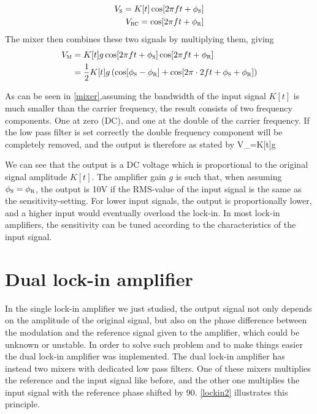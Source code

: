 \begin{align}
V_{\mbox{\footnotesize{\scshape{s}}}}=K[t]\cos[2\pi ft+\phi_{\mbox{\footnotesize{\scshape{s}}}}]
\label{sinusoidal}\\
V_{\mbox{\footnotesize{\scshape{rc}}}}=\cos[2\pi ft+\phi_{\mbox{\footnotesize{\scshape{r}}}}]
\label{reference}
\end{align}
The mixer then combines these two signals by multiplying them, giving
\begin{align}
V_{\mbox{\footnotesize{\scshape{m}}}}&=K[t] g\cos[2\pi ft+\phi_{\mbox{\footnotesize{\scshape{s}}}}]\cos[2\pi ft+\phi_{\mbox{\footnotesize{\scshape{r}}}}]\nonumber\\
&=\frac{1}{2}K[t]g\left(\cos[\phi_{\mbox{\footnotesize{\scshape{s}}}}-\phi_{\mbox{\footnotesize{\scshape{r}}}}]+\cos[2\pi\cdot2ft+\phi_{\mbox{\footnotesize{\scshape{s}}}}+ \phi_{\mbox{\footnotesize{\scshape{r}}}}]\right)\label{mixer}
\end{align}

As can be seen in \cref{mixer},assuming the bandwidth of the input signal $K[t]$ is much smaller than the carrier frequency, the result consists of two frequency components. One at zero (DC), and one at the double of the carrier frequency. If the low pass filter is set correctly the double frequency component will be completely removed, and the output is therefore as stated by
\mate
V_{}=K[t]g\cos{}
\atem

We can see that the output is a DC voltage which is proportional to the original signal amplitude $K[t]$. The amplifier gain $g$ is such that, when assuming  $\phi_{\mbox{\footnotesize{\scshape{s}}}}=\phi_{\mbox{\footnotesize{\scshape{r}}}}$, the output is 10V if the RMS-value of the input signal is the same as the sensitivity-setting. For lower input signals, the output is proportionally lower, and a higher input would eventually overload the lock-in. In most lock-in amplifiers, the sensitivity can be tuned according to the characteristics of the input signal.

	\section{Dual lock-in amplifier}
	In the single lock-in amplifier we just studied, the output signal not only depends on the amplitude of the original signal, but also 
	on the phase difference between the modulation and the reference signal given to the amplifier, which could be unknown or unstable.
	In order to solve such problem and to make things easier the dual lock-in amplifier was implemented.
	The dual lock-in amplifier has instead two mixers with dedicated low pass filters. One of these mixers multiplies the reference and the input signal like before, and the other one multiplies the input signal with the reference phase shifted by 90\textdegree. \cref{lockin2} illustrates this principle.

